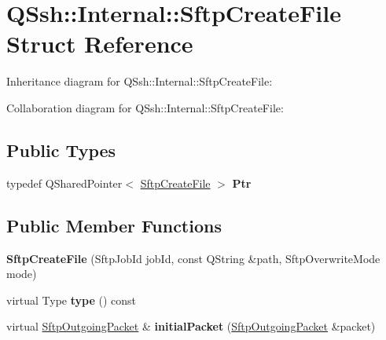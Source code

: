 \hypertarget{struct_q_ssh_1_1_internal_1_1_sftp_create_file}{}\section{Q\+Ssh\+:\+:Internal\+:\+:Sftp\+Create\+File Struct Reference}
\label{struct_q_ssh_1_1_internal_1_1_sftp_create_file}


Inheritance diagram for Q\+Ssh\+:\+:Internal\+:\+:Sftp\+Create\+File\+:


Collaboration diagram for Q\+Ssh\+:\+:Internal\+:\+:Sftp\+Create\+File\+:
\subsection*{Public Types}
\begin{DoxyCompactItemize}
\item 
\mbox{\label{struct_q_ssh_1_1_internal_1_1_sftp_create_file_a7cf7da6fc742d42c0a8693009074b014}} 
typedef Q\+Shared\+Pointer$<$ \mbox{\hyperlink{struct_q_ssh_1_1_internal_1_1_sftp_create_file}{Sftp\+Create\+File}} $>$ {\bfseries Ptr}
\end{DoxyCompactItemize}
\subsection*{Public Member Functions}
\begin{DoxyCompactItemize}
\item 
\mbox{\label{struct_q_ssh_1_1_internal_1_1_sftp_create_file_a44f376e148f9ea7ac169a6dadfeb2add}} 
{\bfseries Sftp\+Create\+File} (Sftp\+Job\+Id job\+Id, const Q\+String \&path, Sftp\+Overwrite\+Mode mode)
\item 
\mbox{\label{struct_q_ssh_1_1_internal_1_1_sftp_create_file_a621c446f19fe9dbb041b8867c6151c5d}} 
virtual Type {\bfseries type} () const
\item 
\mbox{\label{struct_q_ssh_1_1_internal_1_1_sftp_create_file_aaca6b8d6f24ccb5e892198a9ab60f8f9}} 
virtual \mbox{\hyperlink{class_q_ssh_1_1_internal_1_1_sftp_outgoing_packet}{Sftp\+Outgoing\+Packet}} \& {\bfseries initial\+Packet} (\mbox{\hyperlink{class_q_ssh_1_1_internal_1_1_sftp_outgoing_packet}{Sftp\+Outgoing\+Packet}} \&packet)
\end{DoxyCompactItemize}
